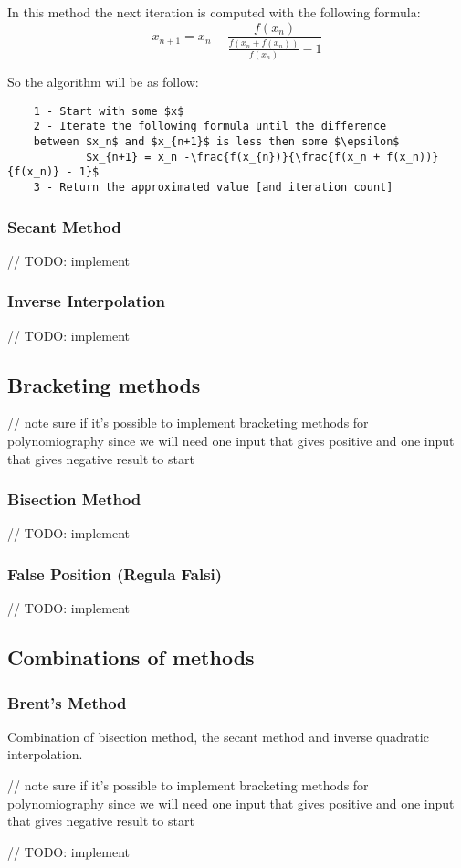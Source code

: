 In this method the next iteration is computed with the following formula:
\[x_{n+1} = x_n -\frac{f(x_{n})}{\frac{f(x_n + f(x_n))}{f(x_n)} - 1}\]


So the algorithm will be as follow:
\begin{lstlisting}
    1 - Start with some $x$
    2 - Iterate the following formula until the difference 
    between $x_n$ and $x_{n+1}$ is less then some $\epsilon$
            $x_{n+1} = x_n -\frac{f(x_{n})}{\frac{f(x_n + f(x_n))}{f(x_n)} - 1}$
    3 - Return the approximated value [and iteration count]
\end{lstlisting}


\subsubsection{Secant Method}
    // TODO: implement

\subsubsection{Inverse Interpolation}
    // TODO: implement

\subsection{Bracketing methods}
    // note sure if it's possible to implement bracketing methods for polynomiography since we will need one input that gives positive and one input that gives negative result to start
\subsubsection{Bisection Method}
    // TODO: implement
    
\subsubsection{False Position (Regula Falsi)}
    // TODO: implement
    
\subsection{Combinations of methods}
\subsubsection{Brent's Method}
    Combination of bisection method, the secant method and inverse quadratic interpolation.
    
    // note sure if it's possible to implement bracketing methods for polynomiography since we will need one input that gives positive and one input that gives negative result to start
    
    // TODO: implement


